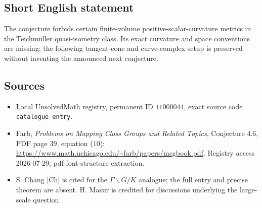 \documentclass[11pt]{article}
\begin{document}
\subsection{Short English statement}
The conjecture forbids certain finite-volume positive-scalar-curvature metrics in the Teichm\"uller quasi-isometry class. Its exact curvature and space conventions are missing; the following tangent-cone and curve-complex setup is preserved without inventing the announced next conjecture.
\subsection{Sources}
\begin{itemize}
\item Local UnsolvedMath registry, permanent ID \(11000044\), exact source code \texttt{catalogue entry}.
\item Farb, \emph{Problems on Mapping Class Groups and Related Topics}, Conjecture 4.6, PDF page 39, equation (10): \url{https://www.math.uchicago.edu/~farb/papers/mcgbook.pdf}. Registry access 2026-07-29; pdf-font-structure extraction.
\item S. Chang [Ch] is cited for the \(\Gamma\backslash G/K\) analogue; the full entry and precise theorem are absent. H. Masur is credited for discussions underlying the large-scale question.
\end{itemize}
\end{document}
